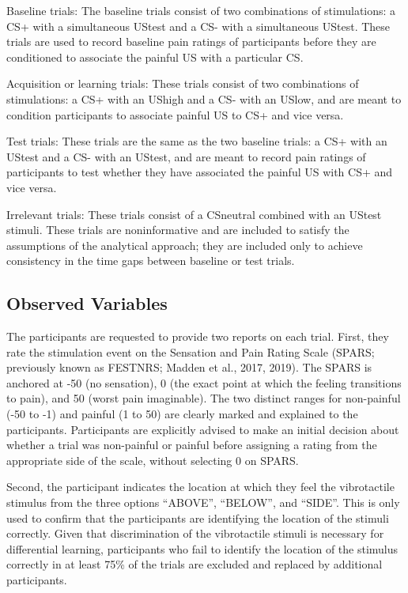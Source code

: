 \documentclass{article}
\begin{document}
Baseline trials: The baseline trials consist of two combinations of stimulations: a CS+ with a simultaneous UStest and a CS- with a simultaneous UStest. These trials are used to record baseline pain ratings of participants before they are conditioned to associate the painful US with a particular CS.

Acquisition or learning trials: These trials consist of two combinations of stimulations: a CS+ with an UShigh and a CS- with an USlow, and are meant to condition participants to associate painful US to CS+ and vice versa.

Test trials: These trials are the same as the two baseline trials: a CS+ with an UStest and a CS- with an UStest, and are meant to record pain ratings of participants to test whether they have associated the painful US with CS+ and vice versa.

Irrelevant trials: These trials consist of a CSneutral combined with an UStest stimuli. These trials are noninformative and are included to satisfy the assumptions of the analytical approach; they are included only to achieve consistency in the time gaps between baseline or test trials. 

\subsection{Observed Variables}

The participants are requested to provide two reports on each trial. First, they rate the stimulation event on the Sensation and Pain Rating Scale (SPARS; previously known as FESTNRS; Madden et al., 2017, 2019). The SPARS is anchored at -50 (no sensation), 0 (the exact point at which the feeling transitions to pain), and 50 (worst pain imaginable). The two distinct ranges for non-painful (-50 to -1) and painful (1 to 50) are clearly marked and explained to the participants. Participants are explicitly advised to make an initial decision about whether a trial was non-painful or painful before assigning a rating from the appropriate side of the scale, without selecting 0 on SPARS. 

Second, the participant indicates the location at which they feel the vibrotactile stimulus from the three options “ABOVE”, “BELOW”, and “SIDE”. This is only used to confirm that the participants are identifying the location of the stimuli correctly. Given that discrimination of the vibrotactile stimuli is necessary for differential learning, participants who fail to identify the location of the stimulus correctly in at least 75\% of the trials are excluded and replaced by additional participants.
\end{document}
